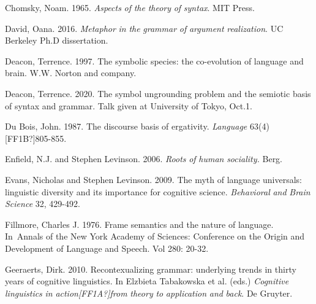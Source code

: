 \begin{stylereferences}
Chomsky, Noam. 1965. \textit{Aspects} \textit{of} \textit{the} \textit{theory} \textit{of} \textit{syntax}. MIT Press. 
\end{stylereferences}

\begin{stylereferences}
David, Oana. 2016. \textit{Metaphor} \textit{in} \textit{the} \textit{grammar} \textit{of} \textit{argument} \textit{realization}. UC Berkeley Ph.D dissertation. 
\end{stylereferences}

\begin{stylereferences}
Deacon, Terrence. 1997. The symbolic species: the co-evolution of language and brain. W.W. Norton and company.
\end{stylereferences}

\begin{stylereferences}
Deacon, Terrence. 2020. The symbol ungrounding problem and the semiotic basis of syntax and grammar. Talk given at University of Tokyo, Oct.1.
\end{stylereferences}

\begin{stylereferences}
Du Bois, John. 1987. The discourse basis of ergativity. \textit{Language} 63(4)[FF1B?]805-855.
\end{stylereferences}

\begin{stylereferences}
Enfield, N.J. and Stephen Levinson. 2006. \textit{Roots} \textit{of} \textit{human} \textit{sociality.} Berg.
\end{stylereferences}

\begin{stylereferences}
Evans, Nicholas and Stephen Levinson. 2009. The myth of language universals: linguistic diversity and its importance for cognitive science. \textit{Behavioral} \textit{and} \textit{Brain} \textit{Science} 32, 429-492.
\end{stylereferences}

\begin{stylereferences}
Fillmore, Charles J. 1976. Frame semantics and the nature of language.  In~Annals of the New York Academy of Sciences: Conference on the Origin and Development of Language and Speech. Vol 280: 20-32.
\end{stylereferences}

\begin{stylereferences}
Geeraerts, Dirk. 2010. Recontexualizing grammar: underlying trends in thirty years of cognitive linguistics. In Elzbieta Tabakowska et al. (eds.) \textit{Cognitive} \textit{linguistics} \textit{in} \textit{action[FF1A?]from} \textit{theory} \textit{to} \textit{application} \textit{and} \textit{back}. De Gruyter.
\end{stylereferences}

